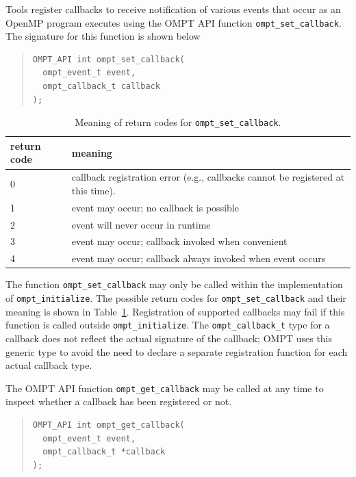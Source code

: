 \documentclass{article}
\begin{document}
Tools register callbacks to receive notification of various events that occur as an OpenMP program executes using the OMPT API function \verb|ompt_set_callback|. The signature for this function is shown below{
 
\begin{quote}
\begin{verbatim}
OMPT_API int ompt_set_callback(
  ompt_event_t event, 
  ompt_callback_t callback
);
\end{verbatim}
\end{quote}


\begin{table}
\centering
\begin{tabular}{|l|l|}
\hline
return code & meaning \\\hline
0 & callback registration error (e.g., callbacks cannot be registered at this time).\\\hline
1 & event may occur; no callback is possible\\\hline
2 & event will never occur in runtime\\\hline
3 & event may occur; callback invoked when convenient\\\hline
4 & event may occur; callback always invoked when event occurs\\\hline
\end{tabular}
\caption{Meaning of return codes for {\tt ompt\_set\_callback}.}
\label{table:set_rc}
\end{table}

\noindent
The  function \verb|ompt_set_callback|  may only be called within the implementation of 
 \verb|ompt_initialize|.
The possible return codes for \verb|ompt_set_callback| and their meaning is shown in Table~\ref{table:set_rc}. 
Registration of supported callbacks may fail if this function is
called outside  \verb|ompt_initialize|.
The \verb|ompt_callback_t| type for a callback does not reflect the actual signature of the callback; OMPT uses  this generic type 
 to avoid the need to declare a separate registration function for each actual callback type.


The  OMPT API function \verb|ompt_get_callback| may be called at any time to inspect whether a callback has been registered or not. 

\begin{quote}
\begin{verbatim}
OMPT_API int ompt_get_callback(
  ompt_event_t event, 
  ompt_callback_t *callback
);
\end{verbatim}
\end{quote}

}
\end{document}
